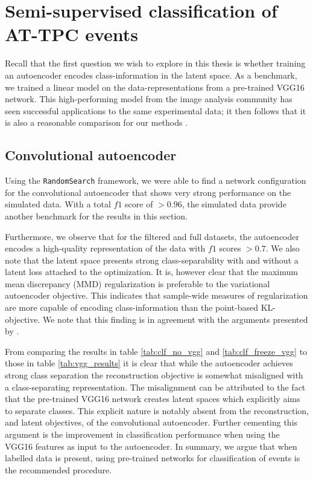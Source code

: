\section{Semi-supervised classification of AT-TPC events}
Recall that the first question we wish to explore in this thesis is whether training an autoencoder encodes class-information in the latent space. As a benchmark, we trained a linear model on the data-representations from a pre-trained VGG16 network. This high-performing model from the image analysis community has seen successful applications to the same experimental data; it then follows that it is also a reasonable comparison for our methods \cite{Kuchera2019}. 

\subsection{Convolutional autoencoder}
Using the \lstinline{RandomSearch} framework, we were able to find a network configuration for the convolutional autoencoder that shows very strong performance on the simulated data. With a total $f1$ score of $>0.96$, the simulated data provide another benchmark for the results in this section.

 Furthermore, we observe that for the filtered and full datasets, the autoencoder encodes a high-quality representation of the data with $f1$ scores $>0.7$. We also note that the latent space presents strong class-separability with and without a latent loss attached to the optimization. It is, however clear that the maximum mean discrepancy (MMD) regularization is preferable to the variational autoencoder objective. This indicates that sample-wide measures of regularization are more capable of encoding class-information than the point-based KL-objective. We note that this finding is in agreement with the arguments presented by \citet{Zhao}. 

 From comparing the results in table \ref{tab:clf_no_vgg} and \ref{tab:clf_freeze_vgg} to those in table \ref{tab:vgg_results} it is clear that while the autoencoder achieves strong class separation the reconstruction objective is somewhat misaligned with a class-separating representation. The misalignment can be attributed to the fact that the pre-trained VGG16 network creates latent spaces which explicitly aims to separate classes. This explicit nature is notably absent from the reconstruction, and latent objectives, of the convolutional autoencoder. Further cementing this argument is the improvement in classification performance when using the VGG16 features as input to the autoencoder. In summary, we argue that when labelled data is present, using pre-trained networks for classification of events is the recommended procedure.

